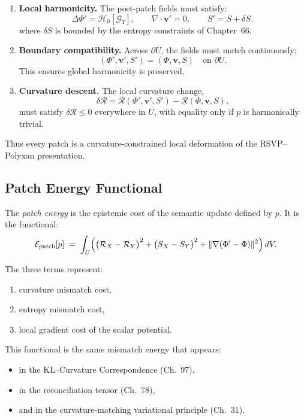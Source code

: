 \begin{enumerate}
\item \textbf{Local harmonicity.}  
      The post-patch fields must satisfy:
      \[
      \Delta \Phi' = \mathcal{H}_0[\mathcal{G}_Y], \qquad
      \nabla\cdot\mathbf{v}' = 0, \qquad
      S' = S + \delta S,
      \]
      where $\delta S$ is bounded by the entropy constraints of Chapter~66.

\item \textbf{Boundary compatibility.}  
      Across $\partial U$, the fields must match continuously:
      \[
      (\Phi',\mathbf{v}',S') = (\Phi,\mathbf{v},S)
      \quad\text{on }\partial U.
      \]
      This ensures global harmonicity is preserved.

\item \textbf{Curvature descent.}  
      The local curvature change,
      \[
      \delta\mathcal{R} = \mathcal{R}(\Phi',\mathbf{v}',S') -
                          \mathcal{R}(\Phi,\mathbf{v},S),
      \]
      must satisfy $\delta\mathcal{R} \le 0$ everywhere in $U$,
      with equality only if $p$ is harmonically trivial.
\end{enumerate}

Thus every patch is a curvature-constrained local deformation
of the RSVP–Polyxan presentation.

\subsection{Patch Energy Functional}
\label{subsec:79-2-energy}

The \emph{patch energy} is the epistemic cost of the semantic update defined by $p$.
It is the functional:
\[
\mathcal{E}_{\mathrm{patch}}[p]
   \;=\;
   \int_{U}
     \Bigl(
       \bigl(\mathcal{R}_X - \mathcal{R}_Y\bigr)^2
       +
       \bigl(S_X - S_Y\bigr)^2
       +
       \|\nabla(\Phi'-\Phi)\|^2
     \Bigr)
     \, dV.
\]

The three terms represent:

\begin{enumerate}
\item curvature mismatch cost,
\item entropy mismatch cost,
\item local gradient cost of the scalar potential.
\end{enumerate}

This functional is the same mismatch energy that appears:

\begin{itemize}
\item in the KL–Curvature Correspondence (Ch.~97),
\item in the reconciliation tensor (Ch.~78),
\item and in the curvature-matching variational principle (Ch.~31).
\end{itemize}

